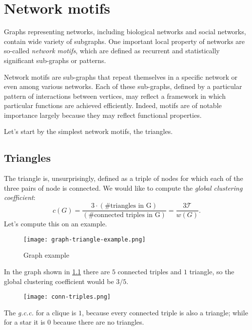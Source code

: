 \chapter{Network motifs}\label{sec:motifs}

Graphs representing networks, including biological networks and social networks, contain wide variety of subgraphs. One important local property of networks are so-called \emph{network motifs}, which are defined as recurrent and statistically significant sub-graphs or patterns.

Network motifs are sub-graphs that repeat themselves in a specific network or even among various networks. Each of these sub-graphs, defined by a particular pattern of interactions between vertices, may reflect a framework in which particular functions are achieved efficiently. Indeed, motifs are of notable importance largely because they may reflect functional properties.

Let's start by the simplest network motifs, the triangles.


\section{Triangles}\label{sec:triangles}

The triangle is, unsurprisingly, defined as a triple of nodes for which each of the three pairs of node is connected. 
We would like to compute the \emph{global clustering coefficient}:
\begin{equation}\label{eq:clustering-coefficient}
    c(G) = \frac{3 \cdot \left(\text{\# triangles in G}\right)}{\left(\text{\# connected triples in G}\right)} = \frac{3 \mathcal{T}}{w(G)}.
\end{equation}
%
Let's compute this on an example.
%
\begin{figure}[h!]
	\centering
	\texttt{[image: graph-triangle-example.png]}
	\caption{Graph example}\label{fig:graph-example-triangles}
\end{figure}

In the graph shown in \cref{fig:graph-example-triangles} there are $5$ connected triples and $1$ triangle, so the global clustering coefficient would be $3/5$.
%
\begin{figure}[h!]
	\centering
	\texttt{[image: conn-triples.png]}
\end{figure}

\obs The \emph{g.c.c.} for a clique is $1$, because every connected triple is also a triangle; while for a star it is $0$ because there are no triangles.

